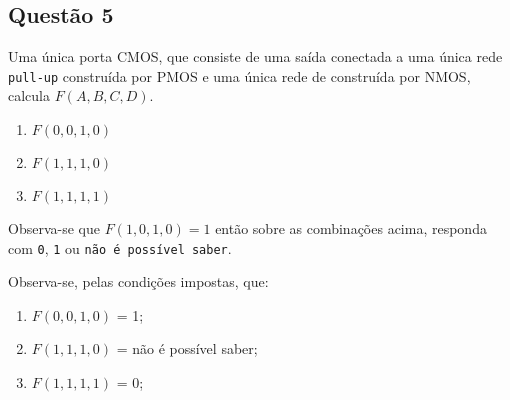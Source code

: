 \documentclass{article}
\begin{document}
\newpage
        \subsection{Questão 5}
            \begin{exercise}
                Uma única porta CMOS, que consiste de uma saída conectada a uma única rede \texttt{pull-up} construída por PMOS e uma única rede de  construída por NMOS, calcula $F(A,B,C,D)$.
                    \begin{enumerate}[noitemsep]
                        \item $F(0,0,1,0)$
                        \item $F(1,1,1,0)$
                        \item $F(1,1,1,1)$
                    \end{enumerate}
                Observa-se que $F(1,0,1,0)=1$ então sobre as combinações acima, responda com \texttt{0}, \texttt{1} ou \texttt{não é possível saber}.
            \end{exercise}
            \begin{resolution}
                Observa-se, pelas condições impostas, que:
                    \begin{enumerate}[noitemsep]
                        \item $F(0,0,1,0)$ = 1;
                        \item $F(1,1,1,0)$ = não é possível saber;
                        \item $F(1,1,1,1)$ = 0; %
                    \end{enumerate}
            \end{resolution}

\newpage
\end{document}
